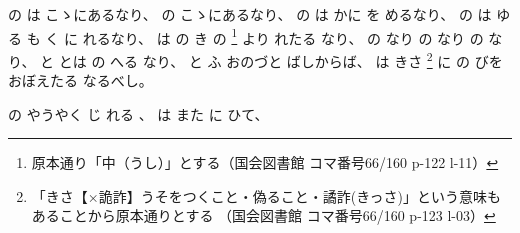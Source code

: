 の
は
こゝにあるなり、%
%
の
こゝにあるなり、%
%
の
%
は
かに
を
めるなり、%
%
の
は
ゆる
も
く
に
れるなり、
%
は
の
き%
の
\footnote{原本通り「中（うし）」とする（国会図書館 コマ番号66/160 p-122 l-11）}%
より
れたる
なり、
%
の
なり
の
なり
の
なり、
%
と
とは
の
へる
なり、
%
と
ふ
おのづと
ばしからば、
%
は
きさ%
\footnote{「きさ【×詭詐】うそをつくこと・偽ること・譎詐(きっさ)」という意味もあることから原本通りとする
（国会図書館 コマ番号66/160 p-123 l-03）}%
に%
の
びを
おぼえたる
なるべし。

%
の
やうやく
じ
れる
、
%
は
また
に
ひて、

